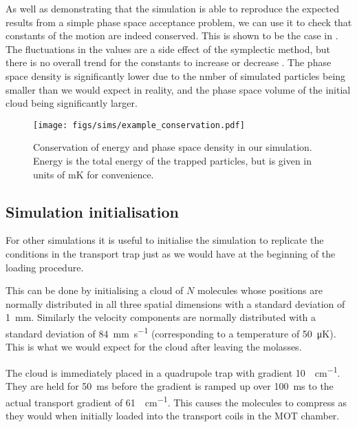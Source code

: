 As well as demonstrating that the simulation is able to reproduce the expected
results from a simple phase space acceptance problem, we can use it to check
that constants of the motion are indeed conserved. This is shown to be the case
in .  The fluctuations in the values are a
side effect of the symplectic method, but there is no overall trend for the
constants to increase or decrease \cite{doi:10.1119/1.2034523}. The phase
space density is significantly lower due to the nmber of simulated particles
being smaller than we would expect in reality, and the phase space volume of
the initial cloud being significantly larger.

\begin{figure}
  \centering
  \texttt{[image: figs/sims/example\_conservation.pdf]}
  \caption{Conservation of energy and phase space density in our simulation.
  Energy is the total energy of the trapped particles, but is given in units of
  \si{\milli\kelvin} for convenience. 
  }
  \label{design:fig:conservation}
\end{figure}

\subsection{Simulation initialisation}

For other simulations it is useful to initialise the simulation to replicate
the conditions in the transport trap just as we would have at the beginning of
the loading procedure.

This can be done by initialising a cloud of $N$ molecules whose positions are
normally distributed in all three spatial dimensions with a standard deviation
of \SI{1}{\milli\meter}. Similarly the velocity components are normally
distributed with a standard deviation of \SI{84}{\milli\meter\per\second}
(corresponding to a temperature of \SI{50}{\micro\kelvin}). This is what we
would expect for the cloud after leaving the molasses.

The cloud is immediately placed in a quadrupole trap with gradient
\SI{10}{\gauss\per\centi\meter}. They are held for \SI{50}{\milli\second}
before the gradient is ramped up over \SI{100}{\milli\second} to the actual
transport gradient of \SI{61}{\gauss\per\centi\meter}. This causes the
molecules to compress as they would when initially loaded into the transport
coils in the MOT chamber.

